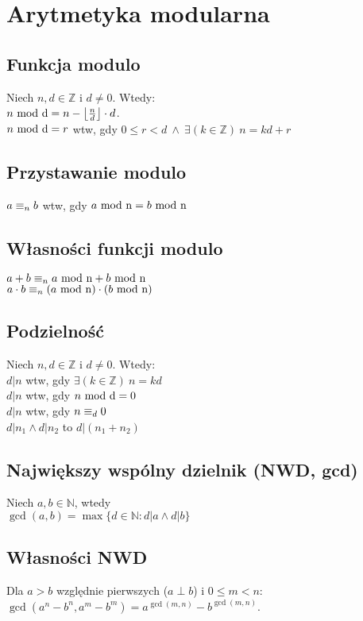 \section{Arytmetyka modularna}

\subsection*{Funkcja modulo}
Niech $n, d \in \mathbb{Z}$ i $d \neq 0$. Wtedy: \\
$n \ \mathrm{mod\ d} = n - \left\lfloor \frac{n}{d} \right\rfloor \cdot d$. \\

$n \ \mathrm{mod\ d} = r$ wtw, gdy ${0 \leq r < d} \ \wedge \ {\exists (k \in \mathbb{Z})} \ {n = kd + r}$

\subsection*{Przystawanie modulo}
$a \equiv_{n} b$ wtw, gdy $a \ \mathrm{mod\ n} = b \ \mathrm{mod\ n}$

\subsection*{Własności funkcji modulo}
$a + b \equiv_{n} a \ \mathrm{mod\ n} + b \ \mathrm{mod\ n}$ \\
$a \cdot b \equiv_{n} (a \ \mathrm{mod\ n}) \cdot (b \ \mathrm{mod\ n})$

\subsection*{Podzielność}
Niech $n, d \in \mathbb{Z}$ i $d \neq 0$. Wtedy: \\
$d | n$ wtw, gdy $\exists (k \in \mathbb{Z}) \ n = kd$ \\
$d | n$ wtw, gdy $n \ \mathrm{mod\ d} = 0$ \\
$d | n$ wtw, gdy $n \equiv_{d} 0$ \\
$d | n_1 \wedge d | n_2$ to $d | (n_1 + n_2)$

\subsection*{Największy wspólny dzielnik (NWD, gcd)}
Niech $a, b \in \mathbb{N}$, wtedy \\
$\gcd(a,b) = \max \{ d \in \mathbb{N} : d|a \wedge d|b \}$

\subsection*{Własności NWD}
Dla $a > b$ względnie pierwszych ($a \perp b$) i $0 \leq m < n$: \\
$\gcd(a^n - b^n, a^m - b^m) = a^{\gcd(m,n)} - b^{\gcd(m,n)}$.

